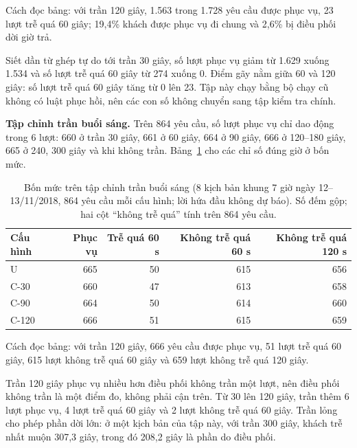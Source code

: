 Cách đọc bảng: với trần 120 giây, 1.563 trong 1.728 yêu cầu được phục vụ, 23 lượt trễ quá 60 giây; 19,4\%
khách được phục vụ đi chung và 2,6\% bị điều phối dời giờ trả.

Siết dần từ ghép tự do tới trần 30 giây, số lượt phục vụ giảm từ 1.629 xuống 1.534 và số lượt trễ quá 60
giây từ 274 xuống 0. Điểm gãy nằm giữa 60 và 120 giây: số lượt trễ quá 60 giây tăng từ 0 lên 23. Tập này
chạy bằng bộ chạy cũ không có luật phục hồi, nên các con số không chuyển sang tập kiểm tra chính.

\textbf{Tập chỉnh trần buổi sáng.} Trên 864 yêu cầu, số lượt phục vụ chỉ dao động trong 6 lượt: 660 ở trần
30 giây, 661 ở 60 giây, 664 ở 90 giây, 666 ở 120--180 giây, 665 ở 240, 300 giây và khi không trần.
Bảng~\ref{bang:c4-sang} cho các chỉ số đúng giờ ở bốn mức.

\begin{table}[htbp]
\centering
\caption{Bốn mức trên tập chỉnh trần buổi sáng (8 kịch bản khung 7 giờ ngày 12--13/11/2018, 864 yêu cầu
mỗi cấu hình; lời hứa đầu không dự báo). Số đếm gộp; hai cột ``không trễ quá'' tính trên 864 yêu cầu.}
\label{bang:c4-sang}
\small
\begin{tabular}{@{}lrrrr@{}}
\toprule
\textbf{Cấu hình} & \textbf{Phục vụ} & \textbf{Trễ quá 60 s} & \textbf{Không trễ quá 60 s} &
\textbf{Không trễ quá 120 s}\\
\midrule
U & 665 & 50 & 615 & 656\\
C-30 & 660 & 47 & 613 & 658\\
C-90 & 664 & 50 & 614 & 660\\
C-120 & 666 & 51 & 615 & 659\\
\bottomrule
\end{tabular}
\end{table}

Cách đọc bảng: với trần 120 giây, 666 yêu cầu được phục vụ, 51 lượt trễ quá 60 giây, 615 lượt không trễ
quá 60 giây và 659 lượt không trễ quá 120 giây.

Trần 120 giây phục vụ nhiều hơn điều phối không trần một lượt, nên điều phối không trần là một điểm đo,
không phải cận trên. Từ 30 lên 120 giây, trần thêm 6 lượt phục vụ, 4 lượt trễ quá 60 giây và 2 lượt
không trễ quá 60 giây. Trần lỏng cho phép phần dời lớn: ở một kịch bản của tập này, với trần 300 giây,
khách trễ nhất muộn 307,3 giây, trong đó 208,2 giây là phần do điều phối.

